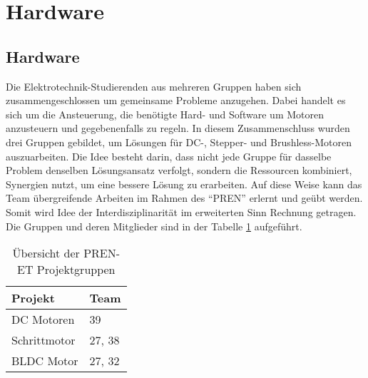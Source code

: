 \ifSTANDALONE
\section{Hardware}
\fi
\ifEMBED
\subsection{Hardware}
\fi
Die Elektrotechnik-Studierenden aus mehreren Gruppen haben sich
zusammengeschlossen um gemeinsame Probleme anzugehen. Dabei handelt es sich
um die Ansteuerung, die benötigte Hard- und Software um Motoren anzusteuern
und gegebenenfalls zu regeln. In diesem Zusammenschluss wurden drei Gruppen
gebildet, um Lösungen für DC-, Stepper- und Brushless-Motoren auszuarbeiten.
Die Idee besteht darin, dass nicht jede Gruppe für dasselbe Problem
denselben Lösungsansatz verfolgt, sondern die Ressourcen kombiniert,
Synergien nutzt, um eine bessere Lösung zu erarbeiten. Auf diese Weise kann
das Team übergreifende Arbeiten im Rahmen des \enquote{PREN} erlernt und
geübt werden. Somit wird Idee der Interdisziplinarität im erweiterten Sinn
Rechnung getragen. Die Gruppen und deren Mitglieder sind in der Tabelle 
\ref{tab:pren-et-overview} aufgeführt.
\begin{table}[h!]
	\centering
	\begin{tabular}{l l}
		Projekt		& Team \\
		\hline
		DC Motoren	& 39 \\
		Schrittmotor	& 27, 38 \\
		BLDC Motor	& 27, 32 \\
	\end{tabular}
	\caption{Übersicht der PREN-ET Projektgruppen}
	\label{tab:pren-et-overview}
\end{table}
